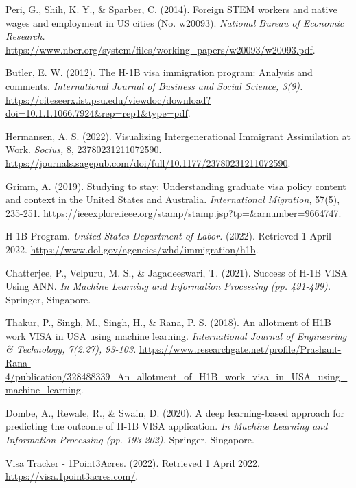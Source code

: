\documentclass[sigconf]{acmart}
\begin{document}
\begin{thebibliography}{12}

\bibitem{}

\textit{}
Peri, G., Shih, K. Y., \& Sparber, C. 
(2014). 
Foreign STEM workers and native wages and employment in US cities (No. w20093). 
\textit{National Bureau of Economic Research. }
\url{https://www.nber.org/system/files/working_papers/w20093/w20093.pdf}.

\bibitem{}
Butler, E. W. 
(2012). 
The H-1B visa immigration program: Analysis and comments. 
\textit{International Journal of Business and Social Science, 3(9).}
\url{https://citeseerx.ist.psu.edu/viewdoc/download?doi=10.1.1.1066.7924&rep=rep1&type=pdf}.


\bibitem{}
Hermansen, A. S. 
(2022). 
Visualizing Intergenerational Immigrant Assimilation at Work. 
\textit{Socius,} 8, 23780231211072590.
\url{https://journals.sagepub.com/doi/full/10.1177/23780231211072590}.

\bibitem{}
Grimm, A. 
(2019). 
Studying to stay: Understanding graduate visa policy content and context in the United States and Australia. 
\textit{International Migration,} 57(5), 235-251. 
\url{https://ieeexplore.ieee.org/stamp/stamp.jsp?tp=&arnumber=9664747}.

\bibitem{} 
	H-1B Program. 
\textit{United States Department of Labor.} 
(2022). 
Retrieved 1 April 2022. 
\url{https://www.dol.gov/agencies/whd/immigration/h1b}.

\bibitem{}
Chatterjee, P., Velpuru, M. S., \& Jagadeeswari, T. 
(2021). 
Success of H-1B VISA Using ANN. 
\textit{In Machine Learning and Information Processing (pp. 491-499).}
 Springer, Singapore.

\bibitem{}
Thakur, P., Singh, M., Singh, H., \& Rana, P. S. 
(2018). 
An allotment of H1B work VISA in USA using machine learning. 
\textit{International Journal of Engineering \& Technology, 7(2.27), 93-103. }
\url{https://www.researchgate.net/profile/Prashant-Rana-4/publication/328488339_An_allotment_of_H1B_work_visa_in_USA_using_machine_learning}.

\bibitem{}
Dombe, A., Rewale, R., \& Swain, D. 
(2020). 
A deep learning-based approach for predicting the outcome of H-1B VISA application. 
\textit{In Machine Learning and Information Processing (pp. 193-202).}
 Springer, Singapore.

\bibitem{}
Visa Tracker - 1Point3Acres. 
(2022). 
Retrieved 1 April 2022.  
\\\url{https://visa.1point3acres.com/}.


\end{thebibliography}
\end{document}
